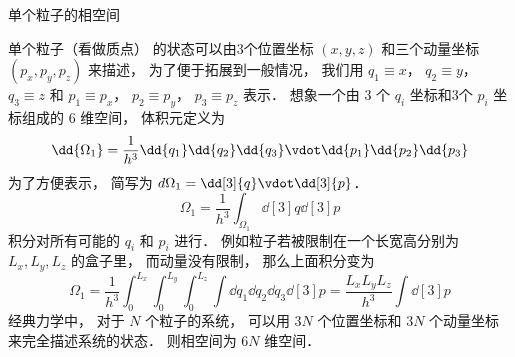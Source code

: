 
\begin{issues}
\issueDraft
\end{issues}

单个粒子的相空间

单个粒子（看做质点） 的状态可以由3个位置坐标 $(x,y,z)$ 和三个动量坐标 $(p_x, p_y, p_z)$ 来描述， 为了便于拓展到一般情况， 我们用 $q_1 \equiv x$，   $q_2 \equiv y$， $q_3 \equiv z$   和 $p_1 \equiv p_x$， $p_2 \equiv p_y$， $p_3 \equiv p_z$ 表示． 想象一个由 3 个 $q_i$  坐标和3个 $p_i$  坐标组成的 $6$ 维空间， 体积元定义为
\begin{equation}
\dd{\Omega_1} = \frac{1}{h^3} \dd{q_1}\dd{q_2}\dd{q_3} \vdot \dd{p_1}\dd{p_2}\dd{p_3}
\end{equation} 
为了方便表示， 简写为  $d{\Omega_1} = \dd[3]{q} \vdot \dd[3]{p}$． 
\begin{equation}
\Omega_1 = \frac{1}{h^3} \int_{\Omega_1} \dd[3]{q} \dd[3]{p}
\end{equation} 
积分对所有可能的 $q_i$ 和 $p_i$ 进行． 例如粒子若被限制在一个长宽高分别为 $L_x, L_y, L_z$ 的盒子里， 而动量没有限制， 那么上面积分变为
\begin{equation}
\Omega_1 = \frac{1}{h^3} \int_0^{L_x} \int_0^{L_y} \int_0^{L_z} \int \dd{q_1} \dd{q_2} \dd{q_3} \dd[3]{p} = \frac{L_x L_y L_z}{h^3} \int \dd[3]{p} 
\end{equation} 
经典力学中， 对于 $N$ 个粒子的系统， 可以用 $3N$ 个位置坐标和 $3N$ 个动量坐标来完全描述系统的状态． 则相空间为 $6N$ 维空间．
